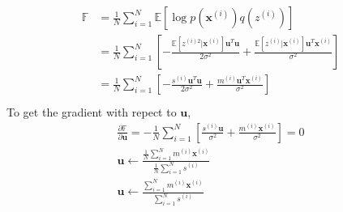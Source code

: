 \documentclass{myhw}
\begin{document}
\begin{homeworkProblem}
\begin{homeworkSection}
\begin{gather*}
\begin{aligned}
\mathbb{F} &= \frac{1}{N} \sum_{i=1}^N \mathbb{E}
[\log p(\bm{x}^{(i)})q(z^{(i)})] \\
&= \frac{1}{N} \sum_{i=1}^N [-\frac{\mathbb{E} [z^{(i)2}|\bm{x}^{(i)}] \bm{u}^T\bm{u}}{2\sigma^2} 
+ \frac{\mathbb{E} [z^{(i)}|\bm{x}^{(i)}] \bm{u}^T \bm{x}^{(i)} }{\sigma^2}] \\
&= \frac{1}{N} \sum_{i=1}^N [-\frac{ s^{(i)} \bm{u}^T\bm{u}}{2\sigma^2} 
+ \frac{ m^{(i)} \bm{u}^T\bm{x}^{(i)}}{\sigma^2}] \\
\end{aligned}
\end{gather*}
To get the gradient with repect to $\bm{u}$,
\begin{gather*}
\frac{\partial \mathbb{F}}{\partial \bm{u}} = 
-\frac{1}{N} \sum_{i=1}^N [\frac{s^{(i)} \bm{u}}{\sigma^2} + \frac{m^{(i)} \bm{x}^{(i)}}{\sigma^2}] = 0 \\
\bm{u} \leftarrow \frac{\frac{1}{N} \sum_{i=1}^N m^{(i)} \bm{x}^{(i)}}{\frac{1}{N} \sum_{i=1}^N s^{(i)}} \\
\bm{u} \leftarrow \frac{\sum_{i=1}^N m^{(i)} \bm{x}^{(i)}}{\sum_{i=1}^N s^{(i)}}
\end{gather*}
\end{homeworkSection}
\end{homeworkProblem}
\end{document}
